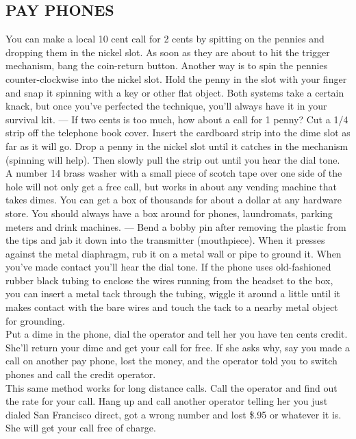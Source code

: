 \documentclass[11pt,twoside,a4paper]{book}
\begin{document}
\subsection{PAY PHONES}

You can make a local 10 cent call for 2 cents by spitting on the pennies and dropping them in the nickel slot. As soon as they are about to hit the trigger mechanism, bang the coin-return button. Another way is to spin the pennies counter-clockwise into the nickel slot. Hold the penny in the slot with your finger and snap it spinning with a key or other flat object. Both systems take a certain knack, but once you've perfected the technique, you'll always have it in your survival kit. --- If two cents is too much, how about a call for 1 penny? Cut a 1/4 strip off the telephone book cover. Insert the cardboard strip into the dime slot as far as it will go. Drop a penny in the nickel slot until it catches in the mechanism (spinning will help). Then slowly pull the strip out until you hear the dial tone.~\\

A number 14 brass washer with a small piece of scotch tape over one side of the hole will not only get a free call, but works in about any vending machine that takes dimes. You can get a box of thousands for about a dollar at any hardware store. You should always have a box around for phones, laundromats, parking meters and drink machines. --- Bend a bobby pin after removing the plastic from the tips and jab it down into the transmitter (mouthpiece). When it presses against the metal diaphragm, rub it on a metal wall or pipe to ground it. When you've made contact you'll hear the dial tone. If the phone uses old-fashioned rubber black tubing to enclose the wires running from the headset to the box, you can insert a metal tack through the tubing, wiggle it around a little until it makes contact with the bare wires and touch the tack to a nearby metal object for grounding.~\\

Put a dime in the phone, dial the operator and tell her you have ten cents credit. She'll return your dime and get your call for free. If she asks why, say you made a call on another pay phone, lost the money, and the operator told you to switch phones and call the credit operator.~\\

This same method works for long distance calls. Call the operator and find out the rate for your call. Hang up and call another operator telling her you just dialed San Francisco direct, got a wrong number and lost \$.95 or whatever it is. She will get your call free of charge.~\\
\end{document}
